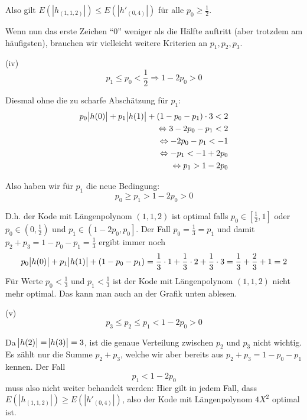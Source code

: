 Also gilt $E(|h_{(1,1,2)}|) \leq E(|h'_{(0,4)}|)$ für alle $p_{0} \geq \frac{1}{2}$.

Wenn nun das erste Zeichen ``$0$'' weniger als die Hälfte auftritt (aber trotzdem am häufigsten), brauchen wir vielleicht weitere Kriterien
an $p_{1}, p_{2}, p_{3}$.

(iv)
\[ p_{1} \leq p_{0} < \frac{1}{2} \Rightarrow 1 - 2p_{0} > 0\]

Diesmal ohne die zu scharfe Abschätzung für $p_{1}$:
\begin{align*}
p_{0}\abs{h(0)} + p_{1}\abs{h(1)} + (1 - p_{0} - p_{1}) \cdot 3 < 2 \\
\Leftrightarrow 3 - 2p_{0} - p_{1} < 2 \\
\Leftrightarrow -2 p_{0} - p_{1} < -1 \\
\Leftrightarrow -p_{1} < -1 + 2p_{0} \\
\Leftrightarrow p_{1} > 1 - 2p_{0}
\end{align*}

Also haben wir für $p_{1}$ die neue Bedingung:
\[
p_{0} \geq p_{1} > 1 - 2p_{0} > 0
\]

D.h. der Kode mit Längenpolynom $(1,1,2)$ ist optimal falls $p_{0} \in \left[\frac{1}{2},1\right]$ oder
$p_{0} \in \left(0,\frac{1}{2}\right)$ und $p_{1} \in \left(1-2p_{0}, p_{0}\right]$.
Der Fall $p_{0} = \frac{1}{3} = p_{1}$ und damit $p_{2} + p_{3} = 1 -  p_{0} - p_{1} = \frac{1}{3}$ ergibt immer noch
\[
p_{0}\abs{h(0)} + p_{1}\abs{h(1)} + (1 - p_{0} - p_{1}) \\
= \frac{1}{3}\cdot 1 + \frac{1}{3}\cdot 2 + \frac{1}{3}\cdot 3 \\
= \frac{1}{3} + \frac{2}{3} + 1 = 2
\]
Für Werte $p_{0} < \frac{1}{3}$ und $p_{1} < \frac{1}{3}$ ist der Kode mit Längenpolynom $(1,1,2)$ nicht mehr optimal.
Das kann man auch an der Grafik unten ablesen.

(v)
\[ p_{3} \leq p_{2} \leq p_{1} < 1-2p_{0} > 0\]

Da $\abs{h(2)} = \abs{h(3)} = 3$, ist die genaue Verteilung zwischen $p_{2}$ und $p_{3}$ nicht wichtig. Es zählt nur
die Summe $p_{2} + p_{3}$, welche wir aber bereits aus $p_{2} + p_{3} = 1 - p_{0} - p_{1}$ kennen. Der Fall
\[ p_{1} < 1-2p_{0} \]
muss also nicht weiter behandelt werden: Hier gilt in jedem Fall, dass  $E(|h_{(1,1,2)}|) \geq E(|h'_{(0,4)}|)$, also der Kode
mit Längenpolynom $4X^2$ optimal ist.

